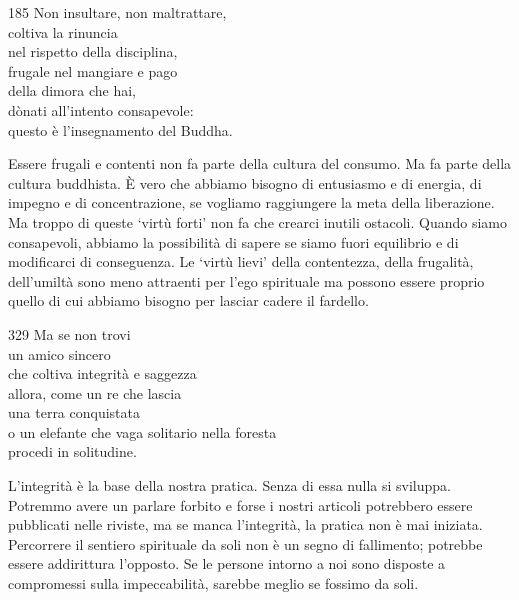 
\begin{dhpVerse}{185}
\label{dhp-185}
Non insultare, non maltrattare,\\
coltiva la rinuncia\\
nel rispetto della disciplina,\\
frugale nel mangiare e pago\\
della dimora che hai,\\
dònati all'intento consapevole:\\
questo è l'insegnamento del Buddha.
\end{dhpVerse}

\begin{dhpRefl}
  Essere frugali e contenti non fa parte della cultura del consumo. Ma fa parte
  della cultura buddhista. È vero che abbiamo bisogno di entusiasmo e di
  energia, di impegno e di concentrazione, se vogliamo raggiungere la meta della
  liberazione. Ma troppo di queste `virtù forti' non fa che crearci inutili
  ostacoli. Quando siamo consapevoli, abbiamo la possibilità di sapere se siamo
  fuori equilibrio e di modificarci di conseguenza. Le `virtù lievi' della
  contentezza, della frugalità, dell'umiltà sono meno attraenti per l'ego
  spirituale ma possono essere proprio quello di cui abbiamo bisogno per lasciar
  cadere il fardello.
\end{dhpRefl}


\begin{dhpVerse}{329}
\label{dhp-329}
Ma se non trovi\\
un amico sincero\\
che coltiva integrità e saggezza\\
allora, come un re che lascia\\
una terra conquistata\\
o un elefante che vaga solitario nella foresta\\
procedi in solitudine.
\end{dhpVerse}

\begin{dhpRefl}
  L'integrità è la base della nostra pratica. Senza di essa nulla si sviluppa.
  Potremmo avere un parlare forbito e forse i nostri articoli potrebbero essere
  pubblicati nelle riviste, ma se manca l'integrità, la pratica non è mai
  iniziata. Percorrere il sentiero spirituale da soli non è un segno di
  fallimento; potrebbe essere addirittura l'opposto. Se le persone intorno a noi
  sono disposte a compromessi sulla impeccabilità, sarebbe meglio se fossimo da
  soli.
\end{dhpRefl}

